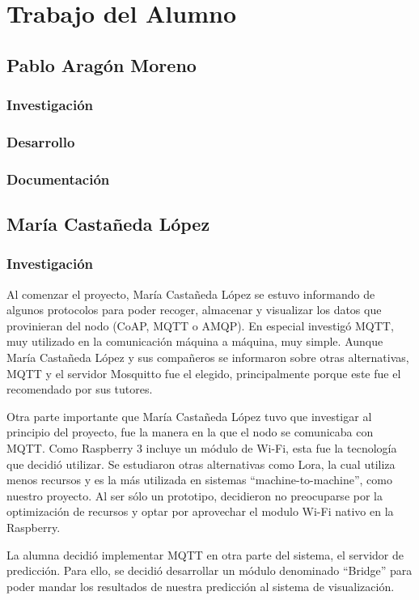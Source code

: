 \cleardoublepage

\chapter{Trabajo del Alumno}
\label{makereference11}

\section{Pablo Aragón Moreno}
\subsection{Investigación}
\subsection{Desarrollo}
\subsection{Documentación}


\section{María Castañeda López}
\subsection{Investigación}
Al comenzar el proyecto, María Castañeda López se estuvo informando de algunos protocolos para poder recoger, almacenar y visualizar los datos que provinieran del nodo (CoAP, MQTT o AMQP). En especial investigó MQTT, muy utilizado en la comunicación máquina a máquina, muy simple. Aunque María Castañeda López y sus compañeros se informaron sobre otras alternativas, MQTT y el servidor Mosquitto fue el elegido, principalmente porque este fue el recomendado por sus tutores. 

Otra parte importante que María Castañeda López tuvo que investigar al principio del proyecto, fue la manera en la que el nodo se comunicaba con MQTT. Como Raspberry 3 incluye un módulo de Wi-Fi, esta fue la tecnología que decidió utilizar. Se estudiaron otras alternativas como Lora, la cual utiliza menos recursos y es la más utilizada en sistemas ``machine-to-machine'', como nuestro proyecto. Al ser sólo un prototipo, decidieron no preocuparse por la optimización de recursos y optar por aprovechar el modulo Wi-Fi nativo en la Raspberry.

La alumna decidió implementar MQTT en otra parte del sistema, el servidor de predicción. Para ello, se decidió desarrollar un módulo denominado ``Bridge'' para poder mandar los resultados de nuestra predicción al sistema de visualización.

